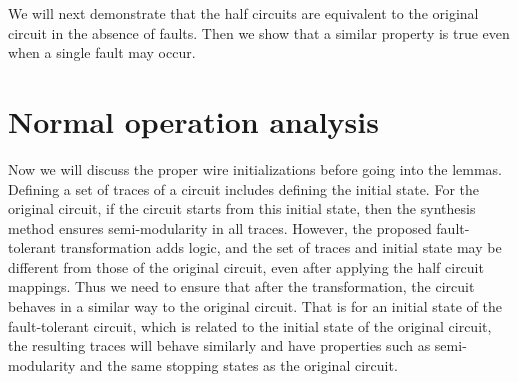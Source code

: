 \documentclass[12pt]{report}
\begin{document}

We will next demonstrate that the half circuits are equivalent to the original circuit in the absence of faults.  Then we show that a similar property is true even when a single fault may occur.

\section{Normal operation analysis}
Now we will discuss the proper wire initializations before going into the lemmas.  Defining a set of traces of a circuit includes defining the initial state.  For the original circuit, if the circuit starts from this initial state, then the synthesis method ensures semi-modularity in all traces.  However, the proposed fault-tolerant transformation adds logic, and the set of traces and initial state may be different from those of the original circuit, even after applying the half circuit mappings.  Thus we need to ensure that after the transformation, the circuit behaves in a similar way to the original circuit.  That is for an initial state of the fault-tolerant circuit, which is related to the initial state of the original circuit, the resulting traces will behave similarly and have properties such as semi-modularity and the same stopping states as the original circuit. \\
\end{document}
